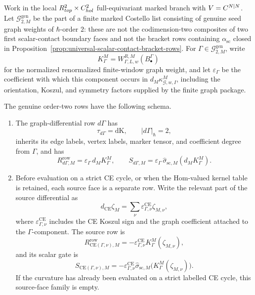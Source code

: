 \begin{prop}\label{prop:genuine-order-two-graph-weight-rows}
  Work in the local
  \(R^2_{top}\times C^2_{hol}\) full-equivariant marked
  branch with \(V=C^{N|N}\).  Let
  \(\mathcal G^{\mathrm{gen}}_{2,M}\) be the part of a finite marked
  Costello list consisting of genuine seed graph weights of
  \(\hbar\)-order \(2\): these are not the codimension-two composites of
  two first scalar-contact boundary faces and not the bracket rows
  containing \(\alpha_{\mathrm{sc}}\) closed in
  Proposition~\ref{prop:universal-scalar-contact-bracket-rows}.  For
  \(\Gamma\in\mathcal G^{\mathrm{gen}}_{2,M}\), write
  \[
    K^M_\Gamma=
    W^{R,M}_{\Gamma,L,w}(B^\Gamma_\bullet)
  \]
  for the normalized renormalized finite-window graph weight, and let
  \(\varepsilon_\Gamma\) be the coefficient with which this component
  occurs in \(d_M\kappa^M_{\mathcal G,w,I}\), including the orientation,
  Koszul, and symmetry factors supplied by the finite graph package.

  The genuine order-two rows have the following schema.
  \begin{enumerate}[label=(G\arabic*)]
    \item The graph-differential row \(d\Gamma\) has
      \[
        \tau_{d\Gamma}=\mathrm{dK},\qquad |d\Gamma|_\hbar=2,
      \]
      inherits its edge labels, vertex labels, marker tensor, and
      coefficient degree from \(\Gamma\), and has
      \[
        R^{\mathrm{row}}_{d\Gamma,M}
          =
        \varepsilon_\Gamma\,d_M K^M_\Gamma,
        \qquad
        S_{d\Gamma,M}
          =
        \varepsilon_\Gamma\,
        \widehat\sigma_{\mathrm{sc},M}(d_M K^M_\Gamma).
      \]

    \item Before evaluation on a strict CE cycle, or when the Hom-valued
      kernel table is retained, each source face is a separate row.  Write
      the relevant part of the source differential as
      \[
        d_{\mathrm{CE}}\zeta_M
          =
        \sum_\nu
        \varepsilon^{\mathrm{CE}}_{\Gamma,\nu}\zeta_{M,\nu},
      \]
      where \(\varepsilon^{\mathrm{CE}}_{\Gamma,\nu}\) includes the CE
      Koszul sign and the graph coefficient attached to the
      \(\Gamma\)-component.  The source row is
      \[
        R^{\mathrm{row}}_{\mathrm{CE}(\Gamma,\nu),M}
          =
        -\varepsilon^{\mathrm{CE}}_{\Gamma,\nu}
        K^M_\Gamma(\zeta_{M,\nu}),
      \]
      and its scalar gate is
      \[
        S_{\mathrm{CE}(\Gamma,\nu),M}
          =
        -\varepsilon^{\mathrm{CE}}_{\Gamma,\nu}
        \widehat\sigma_{\mathrm{sc},M}
        \bigl(K^M_\Gamma(\zeta_{M,\nu})\bigr).
      \]
      If the curvature has already been evaluated on a strict labelled CE
      cycle, this source-face family is empty.
  \end{enumerate}


\end{prop}
